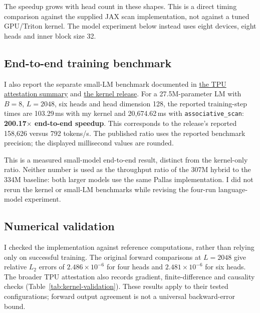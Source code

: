 \documentclass[10pt,a4paper]{article}
\begin{document}
The speedup grows with head count in these shapes. This is a direct timing comparison
against the supplied JAX scan implementation, not against a tuned GPU/Triton kernel.
The model experiment below instead uses eight devices, eight heads and inner block size 32.

\subsection{End-to-end training benchmark}
I also report the separate small-LM benchmark documented in
\href{https://github.com/Akseleu-J/atomic-ops/blob/0dbc59cf74883315d7adbebe9229c520663e0d58/docs/ATTESTATION.md}{the TPU attestation summary}
and \href{https://github.com/Akseleu-J/atomic-ops/blob/0dbc59cf74883315d7adbebe9229c520663e0d58/README.md}{the kernel release}.
For a 27.5M-parameter LM with $B=8$, $L=2048$, six heads and head dimension 128,
the reported training-step times are 103.29\,ms with my kernel and 20,674.62\,ms with
\texttt{associative\_scan}: \textbf{200.17$\times$ end-to-end speedup}.
This corresponds to the release's reported 158,626 versus 792 tokens/s.
The published ratio uses the reported benchmark precision; the displayed millisecond
values are rounded.

This is a measured small-model end-to-end result, distinct from the kernel-only ratio.
Neither number is used as the throughput ratio of the 307M hybrid to the 334M baseline:
both larger models use the same Pallas implementation. I did not rerun the kernel or
small-LM benchmarks while revising the four-run language-model experiment.

\subsection{Numerical validation}
I checked the implementation against reference computations, rather than relying only
on successful training. The original forward comparisons at $L=2048$ give relative
$L_2$ errors of $2.486\times10^{-6}$ for four heads and $2.481\times10^{-6}$ for six heads.
The broader TPU attestation also records gradient, finite-difference and causality checks
(Table~\ref{tab:kernel-validation}). These results apply to their tested configurations;
forward output agreement is not a universal backward-error bound.
\end{document}
